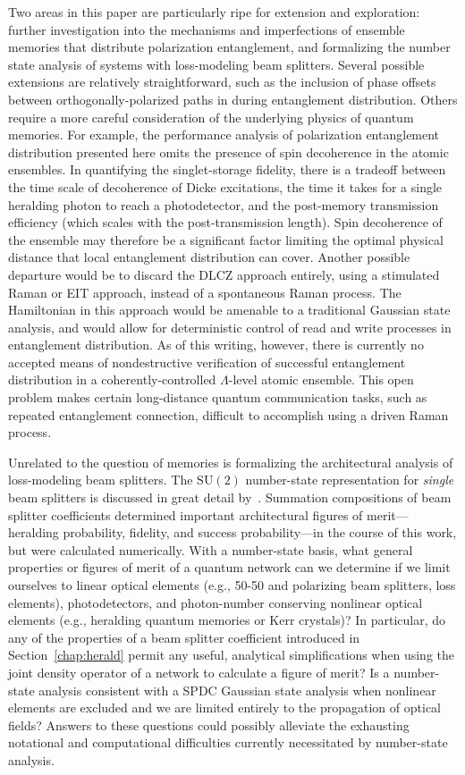 \documentclass[aps,twocolumn,secnumarabic,amsmath,amssymb,pra,groupedaddress,
showpacs, showkeys]{revtex4-1}
\newcommand{\pna}[1]{\left(#1\right)}
\begin{document}
Two areas in this paper are particularly ripe for extension and exploration:
further investigation into the mechanisms and imperfections of ensemble
memories that distribute polarization entanglement, and formalizing the number
state analysis of systems with loss-modeling beam splitters. Several possible
extensions are relatively straightforward, such as the inclusion of phase
offsets between orthogonally-polarized paths in during entanglement
distribution. Others require a more careful consideration of the underlying
physics of quantum memories. For example, the performance analysis of
polarization entanglement distribution presented here omits the presence of
spin decoherence in the atomic ensembles. In quantifying the singlet-storage
fidelity, there is a tradeoff between the time scale of decoherence of Dicke
excitations, the time it takes for a single heralding photon to reach a
photodetector, and the post-memory transmission efficiency (which scales with
the post-transmission length). Spin decoherence of the ensemble may therefore
be a significant factor limiting the optimal physical distance that local
entanglement distribution can cover. Another possible departure would be to
discard the DLCZ approach entirely, using a stimulated Raman or EIT approach,
instead of a spontaneous Raman process. The Hamiltonian in this approach would
be amenable to a traditional Gaussian state analysis, and would allow for
deterministic control of read and write processes in entanglement
distribution. As of this writing, however, there is currently no accepted means
of nondestructive verification of successful entanglement distribution in a
coherently-controlled $\Lambda$-level atomic ensemble. This open problem makes
certain long-distance quantum communication tasks, such as repeated
entanglement connection, difficult to accomplish using a driven Raman process.

Unrelated to the question of memories is formalizing the architectural analysis
of loss-modeling beam splitters. The $\textrm{SU}\pna{2}$ number-state
representation for \emph{single} beam splitters is discussed in great detail
by~\cite{PhysRevA.40.1371}. Summation compositions of beam splitter
coefficients determined important architectural figures of merit---heralding
probability, fidelity, and success probability---in the course of this work,
but were calculated numerically. With a number-state basis, what general
properties or figures of merit of a quantum network can we determine if we
limit ourselves to linear optical elements (e.g., 50-50 and polarizing beam
splitters, loss elements), photodetectors, and photon-number conserving
nonlinear optical elements (e.g., heralding quantum memories or Kerr crystals)?
In particular, do any of the properties of a beam splitter coefficient
introduced in Section~\ref{chap:herald} permit any useful, analytical
simplifications when using the joint density operator of a network to calculate
a figure of merit? Is a number-state analysis consistent with a SPDC Gaussian
state analysis when nonlinear elements are excluded and we are limited entirely
to the propagation of optical fields? Answers to these questions could possibly
alleviate the exhausting notational and computational difficulties currently
necessitated by number-state analysis.
\end{document}
